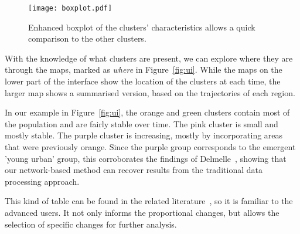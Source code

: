 \begin{figure}
    \centering 
    \texttt{[image: boxplot.pdf]}
    \caption{Enhanced boxplot of the clusters' characteristics allows a quick
    comparison to the other clusters.\label{fig:boxplot}}
\end{figure}


With the knowledge of what clusters are present, we can explore where they are
through the maps, marked as \emph{where} in Figure~\ref{fig:ui}. While the maps
on the lower part of the interface show the location of the clusters at each
time, the larger map shows a summarised version, based on the trajectories of
each region. 

 In our example in Figure~\ref{fig:ui},
the orange and green clusters contain most of the population and are fairly
stable over time. The pink cluster is small and mostly stable. The purple
cluster is increasing, mostly by incorporating areas that were previously
orange. Since the purple group corresponds to the emergent 'young urban' group,
this corroborates the findings of Delmelle~\citep{Delmelle2016,Delmelle2017},
showing that our network-based method can recover results from the traditional
data processing approach.

 This kind of table can be
found in the related literature~\citep{Delmelle2016}, so it is familiar to the
advanced users. It not only informs the proportional changes, but allows the
selection of specific changes for further analysis.


